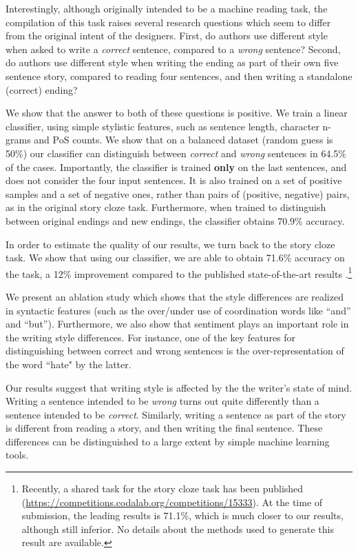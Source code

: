 \documentclass[11pt,a4paper]{article}
\begin{document}
Interestingly, although originally intended to be a machine reading task, the compilation of this task raises several research questions which seem to differ from the original intent of the designers.
First, do authors use different style when asked to write a {\it correct} sentence, compared to a {\it wrong} sentence?
Second, do authors use different style when writing the ending as part of their own five sentence story, compared to reading four sentences, and then writing a standalone (correct) ending?

We show that the answer to both of these questions is positive. 
We train a linear classifier, using simple stylistic features, such as sentence length, character n-grams and PoS counts. 
We show that on a balanced dataset (random guess is 50\%) our classifier can distinguish between {\it correct} and {\it wrong} sentences in 64.5\% of the cases. 
Importantly, the classifier is trained {\bf only} on the last sentences, and does not consider the four input sentences.
It is also trained on a set of positive samples and a set of negative ones, rather than pairs of (positive, negative) pairs, as in the original story cloze task.
Furthermore, when trained to distinguish between original endings and new endings, the classifier obtains 70.9\% accuracy. 


In order to estimate the quality of our results, we turn back to the story cloze task.
We show that using our classifier, we are able to obtain 71.6\% accuracy on the task, a 12\% improvement compared to the published state-of-the-art results \cite{Speer:2016}.\footnote{Recently, a shared task for the story cloze task has been published (\url{https://competitions.codalab.org/competitions/15333}). 
At the time of submission, the leading results is 71.1\%, which is much closer to our results, although still inferior.
No details about the methods used to generate this result are available.}

We present an ablation study which shows that the style differences are realized in syntactic features (such as the over/under use of coordination words like ``and'' and ``but'').
Furthermore, we also show that sentiment plays an important role in the writing style differences.
For instance, one of the key features for distinguishing between correct and wrong sentences is the over-representation of the word ``hate" by the latter.

Our results suggest that writing style is affected by the the writer's state of mind.
Writing a sentence intended to be {\it wrong} turns out quite differently than a sentence intended to be {\it correct}. 
Similarly, writing a sentence as part of the story is different from reading a story, and then writing the final sentence.
These differences can be distinguished to a large extent by simple machine learning tools.
\end{document}

